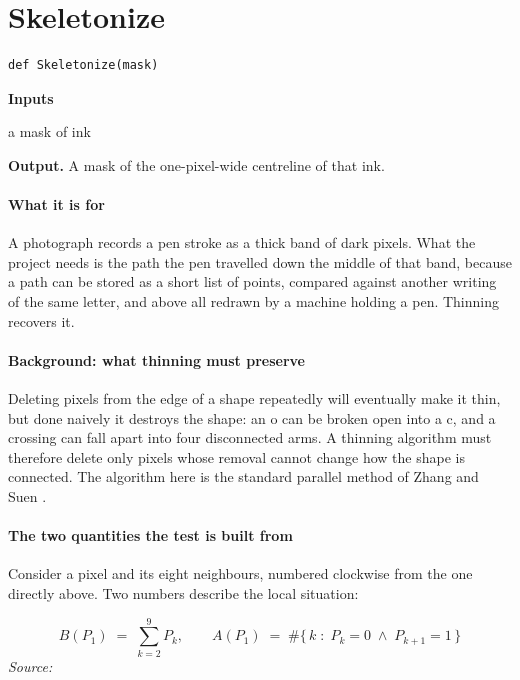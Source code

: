 \section{Skeletonize}
\begin{lstlisting}[style=sig]
def Skeletonize(mask)
\end{lstlisting}

\noindent\textbf{Inputs}
\begin{description}[leftmargin=2.2em,style=nextline,font=\normalfont\ttfamily]\setlength\itemsep{1pt}
  \item[{mask}] \normalfont a mask of ink
\end{description}

\noindent\textbf{Output.} A mask of the one-pixel-wide centreline of that ink.


\paragraph{What it is for}
A photograph records a pen stroke as a thick band of dark pixels. What the project needs is the path the pen travelled down the middle of that band, because a path can be stored as a short list of points, compared against another writing of the same letter, and above all redrawn by a machine holding a pen. Thinning recovers it.


\paragraph{Background: what thinning must preserve}
Deleting pixels from the edge of a shape repeatedly will eventually make it thin, but done naively it destroys the shape: an o can be broken open into a c, and a crossing can fall apart into four disconnected arms. A thinning algorithm must therefore delete only pixels whose removal cannot change how the shape is connected. The algorithm here is the standard parallel method of Zhang and Suen \cite{zhangsuen1984}.


\paragraph{The two quantities the test is built from}
Consider a pixel and its eight neighbours, numbered clockwise from the one directly above. Two numbers describe the local situation:


\begin{equation}
B(P_1) \;=\; \sum_{k=2}^{9} P_k, \qquad A(P_1) \;=\; \#\big\{\, k \;:\; P_k = 0 \;\wedge\; P_{k+1} = 1 \,\big\}
\end{equation}
\noindent\emph{Source: }\cite{zhangsuen1984}


